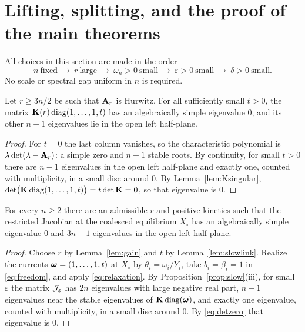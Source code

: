 \section{Lifting, splitting, and the proof of the main theorems}\label{sec:lift}
All choices in this section are made in the order
\begin{equation}\label{eq:order}
 n\ \text{fixed}\ \longrightarrow\ r\ \text{large}\ \longrightarrow\
 \omega_n>0\ \text{small}\ \longrightarrow\
 \varepsilon>0\ \text{small}\ \longrightarrow\ \delta>0\ \text{small}.
\end{equation}
No scale or spectral gap uniform in \(n\) is required.

\begin{lemma}\label{lem:slowlink}
Let \(r\ge3n/2\) be such that \(\mathbf A_r\) is Hurwitz. For all sufficiently small \(t>0\), the
matrix \(\mathbf K(r)\operatorname{diag}(1,\dots,1,t)\) has an algebraically simple eigenvalue \(0\), and its other
\(n-1\) eigenvalues lie in the open left half-plane.
\end{lemma}
\begin{proof}
For \(t=0\) the last column vanishes, so the characteristic polynomial is
\(\lambda\det(\lambda-\mathbf A_r)\): a simple zero and \(n-1\) stable roots. By continuity, for small
\(t>0\) there are \(n-1\) eigenvalues in the open left half-plane and exactly one, counted with
multiplicity, in a small disc around \(0\). By Lemma~\ref{lem:Ksingular},
\(\det\bigl(\mathbf K\operatorname{diag}(1,\dots,1,t)\bigr)=t\det\mathbf K=0\), so that eigenvalue is \(0\).
\end{proof}

\begin{lemma}\label{lem:fullspectral}
For every \(n\ge2\) there are an admissible \(r\) and positive kinetics such that the
restricted Jacobian at the coalesced equilibrium \(X_\circ\) has an algebraically simple
eigenvalue \(0\) and \(3n-1\) eigenvalues in the open left half-plane.
\end{lemma}
\begin{proof}
Choose \(r\) by Lemma~\ref{lem:gain} and \(t\) by Lemma~\ref{lem:slowlink}. Realize the currents
\(\boldsymbol\omega=(1,\dots,1,t)\) at \(X_\circ\) by \(\theta_i=\omega_i/Y_i\), take \(b_i=\beta_i=1\) in
\eqref{eq:freedom}, and apply \eqref{eq:relaxation}. By Proposition~\ref{prop:slow}(iii), for
small \(\varepsilon\) the matrix \(\mathcal J_\varepsilon\) has \(2n\) eigenvalues with large negative
real part, \(n-1\) eigenvalues near the stable eigenvalues of \(\mathbf K\operatorname{diag}(\boldsymbol\omega)\), and exactly
one eigenvalue, counted with multiplicity, in a small disc around \(0\). By
\eqref{eq:detzero} that eigenvalue is \(0\).
\end{proof}

